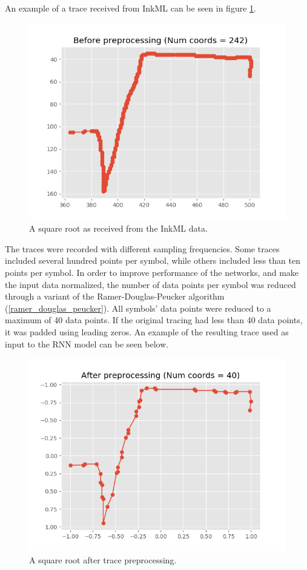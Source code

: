 An example of a trace received from InkML can be seen in figure \ref{fig:sqrt_not_processed}.
\begin{figure}[H]
    \centering
    \includegraphics[width=\linewidth,keepaspectratio]{Assets/Chapter3_Method/sqrt_before_preprocessing.png}
    \caption{A square root as received from the InkML data.}
    \label{fig:sqrt_not_processed}
\end{figure}

The traces were recorded with different sampling frequencies. Some traces included several hundred points per symbol, while others included less than ten points per symbol. In order to improve performance of the networks, and make the input data normalized, the number of data points per symbol was reduced through a variant of the Ramer-Douglas-Peucker algorithm (\ref{ramer_douglas_peucker}). All symbols' data points were reduced to a maximum of 40 data points. If the original tracing had less than 40 data points, it was padded using leading zeros. An example of the resulting trace used as input to the RNN model can be seen below.

\begin{figure}[H]
    \centering
    \includegraphics[width=\linewidth,keepaspectratio]{Assets/Chapter3_Method/sqrt_after_preprocessing.png}
    \caption{A square root after trace preprocessing.}
    \label{fig:sqrt_processed}
\end{figure}

